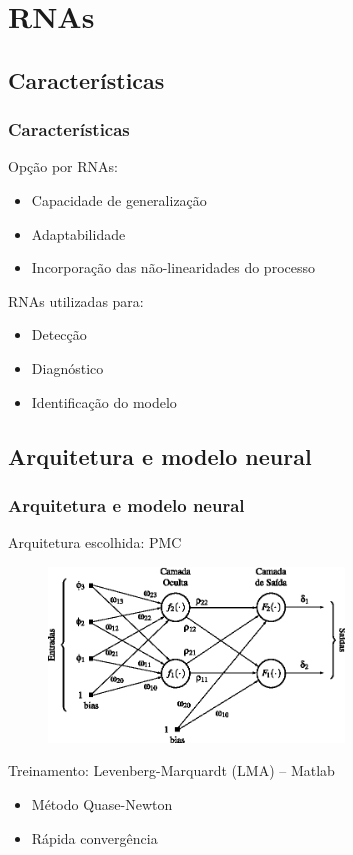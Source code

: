 \documentclass{beamer}
\begin{document}
\section{RNAs}
\subsection{Características}
\begin{frame}
    \frametitle{Características}

    Opção por RNAs:

\begin{itemize}
    \item Capacidade de generalização
    \item Adaptabilidade
    \item Incorporação das não-linearidades do processo
\end{itemize}
    
    RNAs utilizadas para:

\begin{itemize}
    \item Detecção
    \item Diagnóstico
    \item Identificação do modelo
\end{itemize}
\end{frame}

\subsection{Arquitetura e modelo neural}
\begin{frame}
    \frametitle{Arquitetura e modelo neural}

    Arquitetura escolhida: PMC

\begin{figure}[htb]
\centering
    \includegraphics[width=0.7\textwidth]{imgs/rnas/eps/pmc}
\end{figure}

    Treinamento: Levenberg-Marquardt (LMA) -- Matlab\reg

\begin{itemize}
    \item Método Quase-Newton
    \item Rápida convergência
\end{itemize}

\end{frame}
\end{document}
